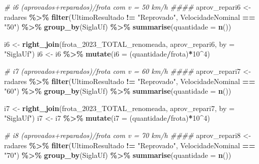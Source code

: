 \documentclass[
]{book}
\newenvironment{Shaded}{\begin{snugshade}}{\end{snugshade}}
\newcommand{\AttributeTok}[1]{\textcolor[rgb]{0.13,0.29,0.53}{#1}}
\newcommand{\CommentTok}[1]{\textcolor[rgb]{0.56,0.35,0.01}{\textit{#1}}}
\newcommand{\DecValTok}[1]{\textcolor[rgb]{0.00,0.00,0.81}{#1}}
\newcommand{\FunctionTok}[1]{\textcolor[rgb]{0.13,0.29,0.53}{\textbf{#1}}}
\newcommand{\NormalTok}[1]{#1}
\newcommand{\OtherTok}[1]{\textcolor[rgb]{0.56,0.35,0.01}{#1}}
\newcommand{\SpecialCharTok}[1]{\textcolor[rgb]{0.81,0.36,0.00}{\textbf{#1}}}
\newcommand{\StringTok}[1]{\textcolor[rgb]{0.31,0.60,0.02}{#1}}
\begin{document}
\begin{Shaded}
\begin{Highlighting}[]
\CommentTok{\# i6 (aprovados+reparados)/frota com v = 50 km/h \#\#\#\#}
\NormalTok{aprov\_repari6 }\OtherTok{\textless{}{-}}\NormalTok{ radares }\SpecialCharTok{\%\textgreater{}\%} 
  \FunctionTok{filter}\NormalTok{(UltimoResultado }\SpecialCharTok{!=} \StringTok{"Reprovado"}\NormalTok{,}
\NormalTok{         VelocidadeNominal }\SpecialCharTok{==} \StringTok{"50"}\NormalTok{) }\SpecialCharTok{\%\textgreater{}\%} 
  \FunctionTok{group\_by}\NormalTok{(SiglaUf) }\SpecialCharTok{\%\textgreater{}\%} 
  \FunctionTok{summarise}\NormalTok{(}\AttributeTok{quantidade =} \FunctionTok{n}\NormalTok{())}


\NormalTok{i6 }\OtherTok{\textless{}{-}} \FunctionTok{right\_join}\NormalTok{(frota\_2023\_TOTAL\_renomeada, aprov\_repari6, }\AttributeTok{by =} \StringTok{"SiglaUf"}\NormalTok{)}
\NormalTok{i6 }\OtherTok{\textless{}{-}}\NormalTok{ i6 }\SpecialCharTok{\%\textgreater{}\%} 
  \FunctionTok{mutate}\NormalTok{(}\AttributeTok{i6 =}\NormalTok{ (quantidade}\SpecialCharTok{/}\NormalTok{frota)}\SpecialCharTok{*}\DecValTok{10}\SpecialCharTok{\^{}}\DecValTok{4}\NormalTok{)}

\CommentTok{\# i7 (aprovados+reparados)/frota com v = 60 km/h \#\#\#\#}
\NormalTok{aprov\_repari7 }\OtherTok{\textless{}{-}}\NormalTok{ radares }\SpecialCharTok{\%\textgreater{}\%} 
  \FunctionTok{filter}\NormalTok{(UltimoResultado }\SpecialCharTok{!=} \StringTok{"Reprovado"}\NormalTok{,}
\NormalTok{         VelocidadeNominal }\SpecialCharTok{==} \StringTok{"60"}\NormalTok{) }\SpecialCharTok{\%\textgreater{}\%} 
  \FunctionTok{group\_by}\NormalTok{(SiglaUf) }\SpecialCharTok{\%\textgreater{}\%} 
  \FunctionTok{summarise}\NormalTok{(}\AttributeTok{quantidade =} \FunctionTok{n}\NormalTok{())}


\NormalTok{i7 }\OtherTok{\textless{}{-}} \FunctionTok{right\_join}\NormalTok{(frota\_2023\_TOTAL\_renomeada, aprov\_repari7, }\AttributeTok{by =} \StringTok{"SiglaUf"}\NormalTok{)}
\NormalTok{i7 }\OtherTok{\textless{}{-}}\NormalTok{ i7 }\SpecialCharTok{\%\textgreater{}\%} 
  \FunctionTok{mutate}\NormalTok{(}\AttributeTok{i7 =}\NormalTok{ (quantidade}\SpecialCharTok{/}\NormalTok{frota)}\SpecialCharTok{*}\DecValTok{10}\SpecialCharTok{\^{}}\DecValTok{4}\NormalTok{)}

\CommentTok{\# i8 (aprovados+reparados)/frota com v = 70 km/h \#\#\#\#}
\NormalTok{aprov\_repari8 }\OtherTok{\textless{}{-}}\NormalTok{ radares }\SpecialCharTok{\%\textgreater{}\%} 
  \FunctionTok{filter}\NormalTok{(UltimoResultado }\SpecialCharTok{!=} \StringTok{"Reprovado"}\NormalTok{,}
\NormalTok{         VelocidadeNominal }\SpecialCharTok{==} \StringTok{"70"}\NormalTok{) }\SpecialCharTok{\%\textgreater{}\%} 
  \FunctionTok{group\_by}\NormalTok{(SiglaUf) }\SpecialCharTok{\%\textgreater{}\%} 
  \FunctionTok{summarise}\NormalTok{(}\AttributeTok{quantidade =} \FunctionTok{n}\NormalTok{())}



\end{Highlighting}
\end{Shaded}
\end{document}
